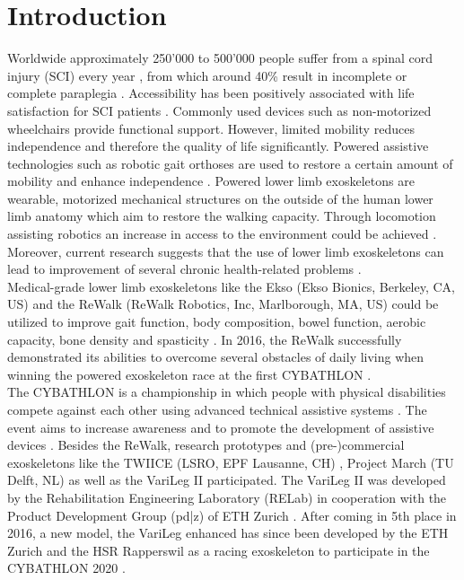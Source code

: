 \documentclass[conference,a4paper]{IEEEtran}
\begin{document}
\section{Introduction}
Worldwide approximately 250’000 to 500’000 people suffer from a spinal cord injury (SCI) every year \cite{WHOSCI}, from which around 40\% result in incomplete or complete paraplegia \cite{National2016}. Accessibility has been positively associated with life satisfaction for SCI patients \cite{Richards1999access}. Commonly used devices such as non-motorized wheelchairs provide functional support. However, limited mobility reduces independence and therefore the quality of life significantly. Powered assistive technologies such as robotic gait orthoses are used to restore a certain amount of mobility and enhance independence \cite{samuelsson2008user}.
Powered lower limb exoskeletons are wearable, motorized mechanical structures on the outside of the human lower limb anatomy which aim to restore the walking capacity. Through locomotion assisting robotics an increase in access to the environment could be achieved \cite{collinger2013functional}.
Moreover, current research suggests that the use of lower limb exoskeletons can lead to improvement of several chronic health-related problems \cite{sciencedirect}. \\


Medical-grade lower limb exoskeletons like the Ekso (Ekso Bionics, Berkeley, CA, US) \cite{eksobionics} and the ReWalk (ReWalk Robotics, Inc, Marlborough, MA, US) \cite{rewalk} could be utilized to improve gait function, body composition, bowel function, aerobic capacity, bone density and spasticity \cite{sciencedirect}. In 2016, the ReWalk successfully demonstrated its abilities to overcome several obstacles of daily living when winning the powered exoskeleton race at the first CYBATHLON \cite{cybathlonwebpage}. \\
The CYBATHLON is a championship in which people with physical disabilities compete against each other using advanced technical assistive systems \cite{cybathlonwebpage} \cite{riener2016cybathlon}. The event aims to increase awareness and to promote the development of assistive devices \cite{ienca2017cybathlon}. Besides the ReWalk, research prototypes and (pre-)commercial exoskeletons like the TWIICE (LSRO, EPF Lausanne, CH) \cite{vouga2017twiice} \cite{twiice}, Project March (TU Delft, NL) \cite{projectmarch} as well as  the VariLeg II participated. The VariLeg II was developed by the Rehabilitation Engineering Laboratory (RELab) in cooperation with the Product Development Group (pd|z) of ETH Zurich \cite{schrade}. After coming in 5th place in 2016, a new model, the VariLeg enhanced has since been developed by the ETH Zurich and the HSR Rapperswil as a racing exoskeleton to participate in the CYBATHLON 2020 \cite{varilegenhanced}. 
\end{document}
